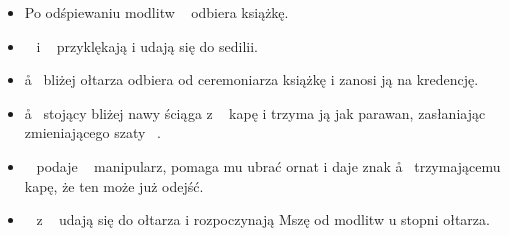 \begin{itemize}
	\item Po odśpiewaniu modlitw \cc~ odbiera książkę.
	\item \ii~ i \cc~ przyklękają i udają się do sedilii.
	\item \aa~ bliżej ołtarza odbiera od ceremoniarza książkę i zanosi ją na
	      kredencję.
	\item \aa~ stojący bliżej nawy ściąga z \ii~ kapę i trzyma ją jak parawan,
	      zasłaniając zmieniającego szaty \ii~.
	\item \cc~ podaje \ii~ manipularz, pomaga mu ubrać ornat i daje znak \aa~
	      trzymającemu kapę, że ten może już odejść.
	\item \ii~ z \cc~ udają się do ołtarza i rozpoczynają Mszę od modlitw u
	      stopni ołtarza.
\end{itemize}
